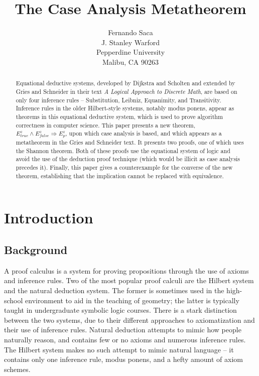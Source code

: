 \documentclass[12pt, fleqn, leqno]{article}
\title{The Case Analysis Metatheorem}
\author{
   Fernando Saca\\
   J. Stanley Warford\\
   Pepperdine University\\
   Malibu, CA 90263}
\date{} %
\newcommand{\impl}{\ensuremath{\Rightarrow}}        %
\begin{document}
\maketitle
\begin{abstract}

Equational deductive systems, developed by Dijkstra and Scholten and extended by Gries and Schneider in their text \textit{A Logical Approach to Discrete Math}, are based on only four inference rules -- Substitution, Leibniz, Equanimity, and Transitivity.
Inference rules in the older Hilbert-style systems, notably modus ponens, appear as theorems in this equational deductive system, which is used to prove algorithm correctness in computer science.
This paper presents a new theorem, $E^{z}_{true}\land E^{z}_{false} \impl E^{z}_{p}$, upon which case analysis is based, and which appears as a metatheorem in the Gries and Schneider text.
It presents two proofs, one of which uses the Shannon theorem.
Both of these proofs use the equational system of logic and avoid the use of the deduction proof technique (which would be illicit as case analysis precedes it).
Finally, this paper gives a counterexample for the converse of the new theorem, establishing that the implication cannot be replaced with equivalence.

\end{abstract}

\thispagestyle{plain}

\section{Introduction}

\subsection{Background}

A proof calculus is a system for proving propositions through the use of axioms and inference rules. Two of the most popular proof calculi are the Hilbert system and the natural deduction system. The former is sometimes used in the high-school environment to aid in the teaching of geometry; the latter is typically taught in undergraduate symbolic logic courses. There is a stark distinction between the two systems, due to their different approaches to axiomatization and their use of inference rules. Natural deduction attempts to mimic how people naturally reason, and contains few or no axioms and numerous inference rules. The Hilbert system makes no such attempt to mimic natural language -- it contains only one inference rule, modus ponens, and a hefty amount of axiom schemes.
\end{document}
